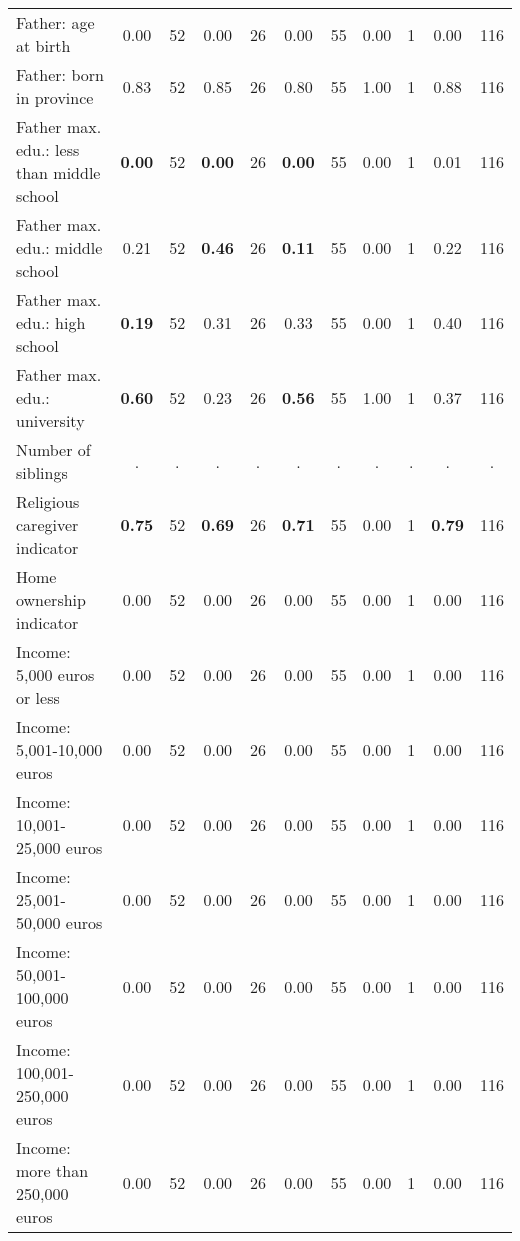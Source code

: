 \begin{tabular}{l c c c c c c c c c c}
Father: age at birth &      0.00 &        52 &      0.00 &        26 &      0.00 &        55 &      0.00 &         1 &      0.00 &       116 \\
Father: born in province &      0.83 &        52 &      0.85 &        26 &      0.80 &        55 &      1.00 &         1 &      0.88 &       116 \\
Father max. edu.: less than middle school & \textbf{     0.00} &        52 & \textbf{     0.00} &        26 & \textbf{     0.00} &        55 &      0.00 &         1 &      0.01 &       116 \\
Father max. edu.: middle school &      0.21 &        52 & \textbf{     0.46} &        26 & \textbf{     0.11} &        55 &      0.00 &         1 &      0.22 &       116 \\
Father max. edu.: high school & \textbf{     0.19} &        52 &      0.31 &        26 &      0.33 &        55 &      0.00 &         1 &      0.40 &       116 \\
Father max. edu.: university & \textbf{     0.60} &        52 &      0.23 &        26 & \textbf{     0.56} &        55 &      1.00 &         1 &      0.37 &       116 \\
Number of siblings &         . & . &         . & . &         . & . &         . & . &         . & . \\
Religious caregiver indicator & \textbf{     0.75} &        52 & \textbf{     0.69} &        26 & \textbf{     0.71} &        55 &      0.00 &         1 & \textbf{     0.79} &       116 \\
Home ownership indicator &      0.00 &        52 &      0.00 &        26 &      0.00 &        55 &      0.00 &         1 &      0.00 &       116 \\
Income: 5,000 euros or less &      0.00 &        52 &      0.00 &        26 &      0.00 &        55 &      0.00 &         1 &      0.00 &       116 \\
Income: 5,001-10,000 euros &      0.00 &        52 &      0.00 &        26 &      0.00 &        55 &      0.00 &         1 &      0.00 &       116 \\
Income: 10,001-25,000 euros &      0.00 &        52 &      0.00 &        26 &      0.00 &        55 &      0.00 &         1 &      0.00 &       116 \\
Income: 25,001-50,000 euros &      0.00 &        52 &      0.00 &        26 &      0.00 &        55 &      0.00 &         1 &      0.00 &       116 \\
Income: 50,001-100,000 euros &      0.00 &        52 &      0.00 &        26 &      0.00 &        55 &      0.00 &         1 &      0.00 &       116 \\
Income: 100,001-250,000 euros &      0.00 &        52 &      0.00 &        26 &      0.00 &        55 &      0.00 &         1 &      0.00 &       116 \\
Income: more than 250,000 euros &      0.00 &        52 &      0.00 &        26 &      0.00 &        55 &      0.00 &         1 &      0.00 &       116 \\
\bottomrule
\end{tabular}
